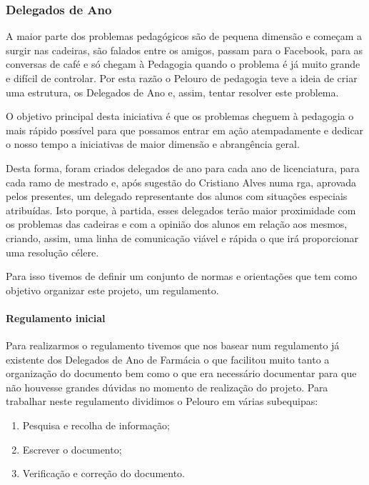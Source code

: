 
\subsubsection{Delegados de Ano}

A maior parte dos problemas pedagógicos são de pequena dimensão e começam a surgir nas cadeiras, são falados entre os amigos, passam para o Facebook, para as conversas de café e só chegam à Pedagogia quando o problema é já muito grande e difícil de controlar. Por esta razão o Pelouro de pedagogia teve a ideia de criar uma estrutura, os Delegados de Ano e, assim, tentar resolver este problema.

O objetivo principal desta iniciativa é que os problemas cheguem à pedagogia o mais rápido possível para que possamos entrar em ação atempadamente e dedicar o nosso tempo a iniciativas de maior dimensão e abrangência geral.

Desta forma, foram criados delegados de ano para cada ano de licenciatura, para cada ramo de mestrado e, após sugestão do Cristiano Alves numa \acrshort{rga}, aprovada pelos presentes, um delegado representante dos alunos com situações especiais atribuídas. Isto porque, à partida, esses delegados terão maior proximidade com os problemas das cadeiras e com a opinião dos alunos em relação aos mesmos, criando, assim, uma linha de comunicação viável e rápida o que irá proporcionar uma resolução célere.

Para isso tivemos de definir um conjunto de normas e orientações que tem como objetivo organizar este projeto, um regulamento.

\paragraph{Regulamento inicial}

Para realizarmos o regulamento tivemos que nos basear num regulamento já existente dos Delegados de Ano de Farmácia o que facilitou muito tanto a organização do documento bem como o que era necessário documentar para que não houvesse grandes dúvidas no momento de realização do projeto. Para trabalhar neste regulamento dividimos o Pelouro em várias subequipas:
\begin{enumerate}
\item Pesquisa e recolha de informação;
\item Escrever o documento;
\item Verificação e correção do documento.
\end{enumerate}

